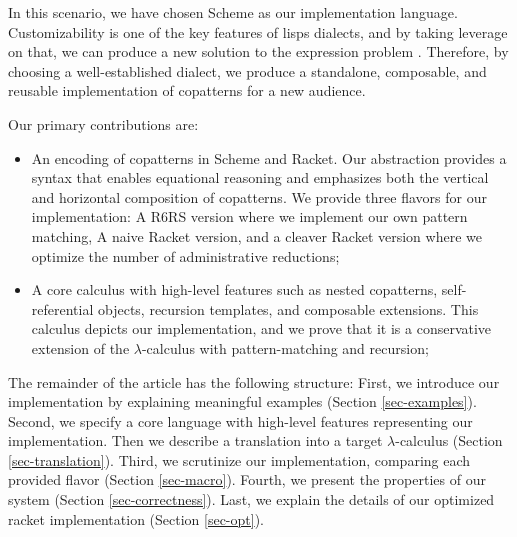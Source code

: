 In this scenario, we have chosen Scheme as our implementation language.
Customizability is one of the key features of lisps dialects, and by taking leverage on that, we can produce a new solution to the expression problem \cite{ExpressionProblem}.
Therefore, by choosing a well-established dialect, we produce a standalone, composable, and reusable implementation of copatterns for a new audience.


Our primary contributions are:
\begin{itemize}
    \item An encoding of copatterns in Scheme and Racket.
    Our abstraction provides a syntax that enables equational reasoning and emphasizes both the vertical and horizontal composition of copatterns.
    We provide three flavors for our implementation: A R6RS version where we implement our own pattern matching, A naive Racket version, and a cleaver Racket version where we optimize the number of administrative reductions;
    \item A core calculus with high-level features such as nested copatterns, self-referential objects, recursion templates, and composable extensions.
    This calculus depicts our implementation, and we prove that it is a conservative extension of the $\lambda$-calculus with pattern-matching and recursion;
\end{itemize} 
The remainder of the article has the following structure: First, we introduce our implementation by explaining meaningful examples (Section \ref{sec-examples}).
Second, we specify a core language with high-level features representing our implementation. Then we describe a translation into a target $\lambda$-calculus (Section \ref{sec-translation}).
Third, we scrutinize our implementation, comparing each provided flavor (Section \ref{sec-macro}).
Fourth, we present the properties of our system (Section \ref{sec-correctness}).
Last, we explain the details of our optimized racket implementation (Section \ref{sec-opt}).


